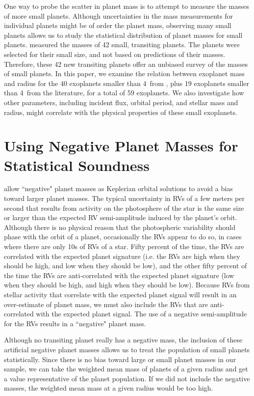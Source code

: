 \documentclass[11pt]{aastex}
\begin{document}
One way to probe the scatter in planet mass is to attempt to measure the masses of more small planets.  Although uncertainties in the mass measurements for individual planets might be of order the planet mass, observing many small planets allows us to study the statistical distribution of planet masses for small planets.  \citet{Marcy2013} measured the masses of 42 small, transiting planets.  The planets were selected for their small size, and not based on predictions of their masses.  Therefore, these 42 new transiting planets offer an unbiased survey of the masses of small planets.  In this paper, we examine the relation between exoplanet mass and radius for the 40 exoplanets smaller than 4\rearth\ from \citet{Marcy2013}, plus 19 exoplanets smaller than 4\rearth\ from the literature, for a total of 59 exoplanets.  We also investigate how other parameters, including incident flux, orbital period, and stellar mass and radius, might correlate with the physical properties of these small exoplanets.

\section{Using Negative Planet Masses for Statistical Soundness}
\citet{Marcy2013} allow ``negative" planet masses as Keplerian orbital solutions to avoid a bias toward larger planet masses.  The typical uncertainty in RVs of a few meters per second that results from activity on the photosphere of the star is the same size or larger than the expected RV semi-amplitude induced by the planet's orbit.  Although there is no physical reason that the photospheric variability should phase with the orbit of a planet, occasionally the RVs appear to do so, in cases where there are only 10s of RVs of a star.  Fifty percent of the time, the RVs are correlated with the expected planet signature (i.e. the RVs are high when they should be high, and low when they should be low), and the other fifty percent of the time the RVs are anti-correlated with the expected planet signature (low when they should be high, and high when they should be low).  Because RVs from stellar activity that correlate with the expected planet signal will result in an over-estimate of planet mass, we must also include the RVs that are anti-correlated with the expected planet signal.  The use of a negative semi-amplitude for the RVs results in a ``negative" planet mass.  

Although no transiting planet really has a negative mass, the inclusion of these artificial negative planet masses allows us to treat the population of small planets statistically.  Since there is no bias toward large or small planet masses in our sample, we can take the weighted mean mass of planets of a given radius and get a value representative of the planet population.  If we did not include the negative masses, the weighted mean mass at a given radius would be too high.
\end{document}
